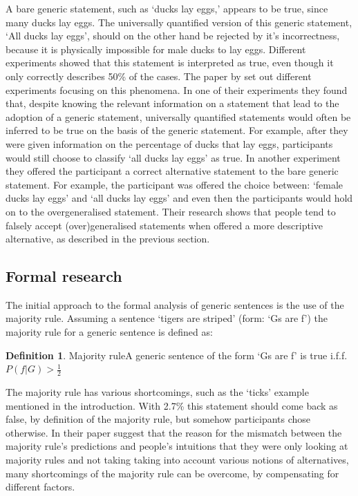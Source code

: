 \documentclass[twoside]{uva-inf-bachelor-thesis}
\theoremstyle{definition}
\newtheorem{definition}{Definition}[section]
\begin{document}
A bare generic statement, such as `ducks lay eggs,' appears to be true, since many ducks lay eggs. The universally quantified version of this generic statement, `All ducks lay eggs', should on the other hand be rejected by it's incorrectness, because it is physically impossible for male ducks to lay eggs. Different experiments showed that this statement is interpreted as true, even though it only correctly describes 50\% of the cases. The paper by \cite{leslie2011all} set out different experiments focusing on this phenomena. In one of their experiments they found that, despite knowing the relevant information on a statement that lead to the adoption of a generic statement, universally quantified statements would often be inferred to be true on the basis of the generic statement. For example, after they were given information on the percentage of ducks that lay eggs, participants would still choose to classify `all ducks lay eggs' as true. In another experiment they offered the participant a correct alternative statement to the bare generic statement. For example, the participant was offered the choice between: `female ducks lay eggs' and `all ducks lay eggs' and even then the participants would hold on to the overgeneralised statement. Their research shows that people tend to falsely accept (over)generalised statements when offered a more descriptive alternative, as described in the previous section. 


\subsection{Formal research}
The initial approach to the formal analysis of generic sentences is the use of the majority rule. Assuming a sentence `tigers are striped' (form: `Gs are f') the majority rule for a generic sentence is defined as:
\theoremstyle{definition}
\begin{definition}{Majority rule}\label{def:mayjorityrule}
A generic sentence of the form `Gs are f' is true i.f.f. $P(f|G) > \frac{1}{2}$
\end{definition}
The majority rule has various shortcomings, such as the `ticks' example mentioned in the introduction. With 2.7\% this statement should come back as false, by definition of the majority rule, but somehow participants chose otherwise. In their paper \cite{RooijSchulzGenAlt} suggest that the reason for the mismatch between the majority rule's predictions and people's intuitions that they were only looking at majority rules and not taking taking into account various notions of alternatives, many shortcomings of the majority rule can be overcome, by compensating for different factors.
\end{document}
